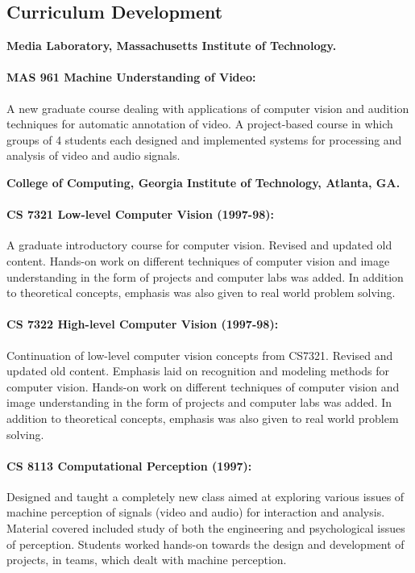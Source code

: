 
\subsection{Curriculum Development}
\label{subsec:curriculum}

\centerline{\textbf{Media Laboratory, Massachusetts Institute of
Technology.}}

\medskip

\paragraph{MAS 961 Machine Understanding of Video:} A new graduate course
dealing with applications of computer vision and audition
techniques for automatic annotation of video. A project-based
course in which groups of 4 students each designed and implemented
systems for processing and analysis of video and audio signals.

\medskip

\centerline{\textbf{College of Computing, Georgia Institute of
Technology, Atlanta, GA.}}


\paragraph{CS 7321 Low-level Computer Vision (1997-98):} A graduate
introductory course for computer vision. Revised and updated old
content. Hands-on work on different techniques of computer vision
and image understanding in the form of projects and computer labs
was added. In addition to theoretical concepts, emphasis was also
given to real world problem solving.

\paragraph{CS 7322 High-level Computer Vision (1997-98):} Continuation of
low-level computer vision concepts from CS7321. Revised and updated old
content. Emphasis laid on recognition and modeling methods for computer
vision. Hands-on work on different techniques of computer vision and image
understanding in the form of projects and computer labs was added. In
addition to theoretical concepts, emphasis was also given to real world
problem solving.

\paragraph{CS 8113 Computational Perception (1997):} Designed and taught a
completely new class aimed at exploring various issues of machine perception
of signals (video and audio) for interaction and analysis. Material covered
included study of both the engineering and psychological issues of
perception. Students worked hands-on towards the design and development of
projects, in teams, which dealt with machine perception.

